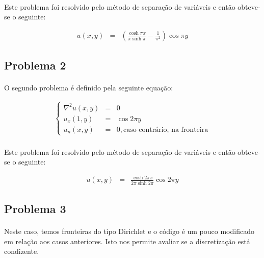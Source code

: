 \documentclass[validacao.tex]{subfiles}
\begin{document}
\paragraph{} Este problema foi resolvido pelo método de separação de variáveis e então obteve-se o seguinte:

\begin{eqnarray}
u(x,y) & = & \left(\frac{\cosh \pi x}{\pi \sinh \pi} - \frac{1}{\pi^2}\right)\cos \pi y
\end{eqnarray}

\subsection{Problema 2}

\paragraph{} O segundo problema é definido pela seguinte equação:


\begin{eqnarray}
\left\{\begin{array}{ccl}
\nabla^2u(x,y) & = & 0\\
u_x(1,y) & = & \cos 2\pi y\\
u_n(x,y) & = & 0, \textrm{caso contrário, na fronteira}
\end{array}\right.
\end{eqnarray}

\paragraph{} Este problema foi resolvido pelo método de separação de variáveis e então obteve-se o seguinte:

\begin{eqnarray}
u(x,y) & = & \frac{\cosh 2\pi x}{2\pi \sinh 2\pi}\cos 2 \pi y
\end{eqnarray}


\subsection{Problema 3}
\paragraph{} Neste caso, temos fronteiras do tipo Dirichlet e o código é um pouco modificado em relação aos casos anteriores. Isto nos permite avaliar se a discretização está condizente.
\end{document}
